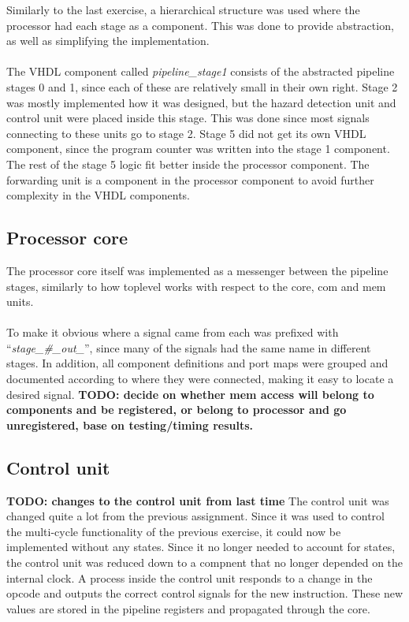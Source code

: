 Similarly to the last exercise, a hierarchical structure was used where the
processor had each stage as a component. This was done to provide abstraction,
as well as simplifying the implementation.
\paragraph*{}
The VHDL component called \emph{pipeline\_stage1} consists of the abstracted
pipeline stages 0 and 1, since each of these are relatively small in their own
right. Stage 2 was mostly implemented how it was designed, but the hazard
detection unit and control unit were placed inside this stage. This was done
since most signals connecting to these units go to stage 2. Stage 5 did not get
its own VHDL component, since the program counter was written into the stage 1
component. The rest of the stage 5 logic fit better inside the processor
component. The forwarding unit is a component in the processor component to
avoid further complexity in the VHDL components.

\subsection{Processor core}
The processor core itself was implemented as a messenger between the pipeline
stages, similarly to how toplevel works with respect to the core, com and mem
units.
\paragraph*{}
To make it obvious where a signal came from each was prefixed with
``\emph{stage\_\#\_out\_}'', since many of the signals had the same name in
different stages. In addition, all component definitions and port maps were
grouped and documented according to where they were connected, making it easy to
locate a desired signal.\newline
\textbf{TODO: decide on whether mem access will belong to components and be registered, or belong to processor and go unregistered, base on testing/timing results.}

\subsection{Control unit}
\textbf{TODO: changes to the control unit from last time}
The control unit was changed quite a lot from the previous assignment. Since it was used to control the multi-cycle functionality of the previous exercise, it could now be implemented without any states. Since it no longer needed to account for states, the control unit was reduced down to a compnent that no longer depended on the internal clock. A process inside the control unit responds to a change in the opcode and outputs the correct control signals for the new instruction. These new values are stored in the pipeline registers and propagated through the core. 
